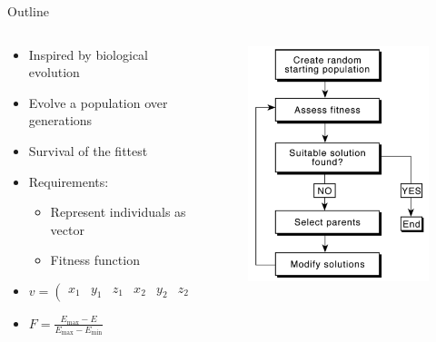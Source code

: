 \documentclass[10pt]{beamer}
\begin{document}
{%
\begin{frame}{Outline}
	\begin{columns}[c] %
		\begin{column}{.48\textwidth}
			\begin{itemize}
				\item {Inspired by biological evolution}
				\item {Evolve a population over generations}
				\item {Survival of the fittest}
				\item {Requirements:}
				\begin{itemize}
					\item {Represent individuals as vector}
					\item {Fitness function}
				\end{itemize}
				\item{$v = \left(\begin{smallmatrix}
					x_1 & y_1 & z_1 & x_2 &  y_2 & z_2 &
					\cdots & x_N & y_N & z_N
					\end{smallmatrix}\right)$}
				\item{$F = \frac{E_{\max} - E}{E_{\max} - E_{\min}}$}
			\end{itemize}

		\end{column}
		\hfill
		\begin{column}{0.48\textwidth}
			\begin{figure}
			\includegraphics[width=0.8\linewidth]{images/GA_outline_Carwright.PNG}
			\end{figure}
		\end{column}
	\end{columns}
\end{frame}
}
\end{document}
